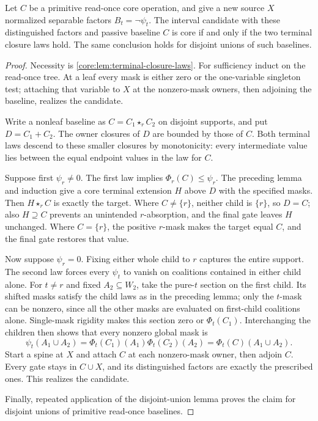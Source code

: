 \begin{theorem}
\label{core:thm:read-once-terminal-extension}
Let $C$ be a primitive read-once core operation, and give a new source
$X$ normalized separable factors $B_t=\neg\psi_t$. The interval
candidate with these distinguished factors and passive baseline $C$
is core if and only if the two terminal closure laws hold.
The same conclusion holds for disjoint unions of such baselines.
\end{theorem}
\begin{proof}
Necessity is \cref{core:lem:terminal-closure-laws}. For sufficiency
induct on the read-once tree. At a leaf every mask is either zero or
the one-variable singleton test; attaching that variable to $X$ at
the nonzero-mask owners, then adjoining the baseline, realizes the
candidate.

Write a nonleaf baseline as $C=C_1\star_r C_2$ on disjoint supports,
and put $D=C_1+C_2$. The owner closures of $D$ are bounded by those
of $C$. Both terminal laws descend to these smaller closures by
monotonicity: every intermediate value lies between the equal endpoint
values in the law for $C$.

Suppose first $\psi_r\ne0$. The first law implies
$\Phi_r(C)\leq\psi_r$. The preceding lemma and induction give a
core terminal extension $H$ above $D$ with the specified masks.
Then $H\star_r C$ is exactly the target.
Where $C\ne\{r\}$, neither child is $\{r\}$, so $D=C$; also
$H\supseteq C$ prevents an unintended $r$-absorption, and the final
gate leaves $H$ unchanged. Where $C=\{r\}$, the positive $r$-mask
makes the target equal $C$, and the final gate restores that value.

Now suppose $\psi_r=0$. Fixing either whole child to $r$ captures
the entire support. The second law forces every $\psi_t$ to vanish
on coalitions contained in either child alone. For $t\ne r$ and fixed
$A_2\subseteq W_2$, take the pure-$t$ section on the first child.
Its shifted masks satisfy the child laws as in the preceding lemma;
only the $t$-mask can be nonzero, since all the other masks are
evaluated on first-child coalitions alone. Single-mask rigidity makes
this section zero or $\Phi_t(C_1)$. Interchanging the children then
shows that every nonzero global mask is
\[
 \psi_t(A_1\cup A_2)=
 \Phi_t(C_1)(A_1)\Phi_t(C_2)(A_2)=\Phi_t(C)(A_1\cup A_2).
\]
Start a spine at $X$ and attach $C$ at each nonzero-mask owner, then
adjoin $C$. Every gate stays in $C\cup X$, and its distinguished
factors are exactly the prescribed ones. This realizes the candidate.

Finally, repeated application of the disjoint-union lemma proves the
claim for disjoint unions of primitive read-once baselines.
\end{proof}
